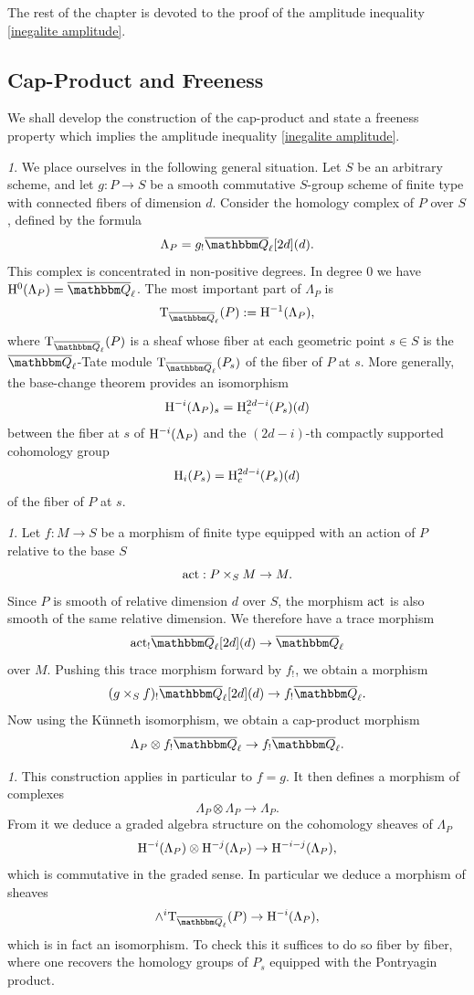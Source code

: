 \documentclass[12pt,english]{smfart}
\numberwithin{equation}{subsection}
\theoremstyle{remark}
\newtheorem{numero}[equation]{}
\newcommand\rmT{{\rm T}}
\newcommand\QQ{{\mathbbm Q}}
\newcommand\rmH{{\rm H}}
\newcommand\act{{\rm act}}
\newcommand\Ql{{\overline\QQ_\ell}}
\begin{document}
The rest of the chapter is devoted to the proof of the amplitude inequality \ref{inegalite amplitude}.

\subsection{Cap-Product and Freeness}\label{subsection : cap-produit}

We shall develop the construction of the cap-product and state a freeness property which implies the amplitude inequality \ref{inegalite amplitude}.

\begin{numero}\label{complexe homologie P}
We place ourselves in the following general situation. Let $S$ be an arbitrary scheme, and let $g:P\rightarrow S$ be a smooth commutative $S$-group scheme of finite type with connected fibers of dimension $d$. Consider the homology complex of $P$ over $S$, defined by the formula
$$\Lambda_P=g_!\Ql[2d](d).$$
This complex is concentrated in non-positive degrees. In degree $0$ we have $\rmH^0(\Lambda_P)=\Ql$. The most important part of $\Lambda_P$ is
$$\rmT_\Ql(P):=\rmH^{-1}(\Lambda_P),$$
where $\rmT_\Ql(P)$ is a sheaf whose fiber at each geometric point $s\in S$ is the $\Ql$-Tate module $\rmT_\Ql(P_s)$ of the fiber of $P$ at $s$. More generally, the base-change theorem provides an isomorphism
$$\rmH^{-i}(\Lambda_P)_s=\rmH_c^{2d-i}(P_s)(d)$$
between the fiber at $s$ of $\rmH^{-i}(\Lambda_P)$ and the $(2d-i)$-th compactly supported cohomology group
$$\rmH_i(P_s)=\rmH_c^{2d-i}(P_s)(d)$$
of the fiber of $P$ at $s$.
\end{numero}

\begin{numero}\label{cap-produit}
Let $f:M\rightarrow S$ be a morphism of finite type equipped with an action of $P$ relative to the base $S$
$$\act:P\times_S M\rightarrow M.$$
Since $P$ is smooth of relative dimension $d$ over $S$, the morphism $\act$ is also smooth of the same relative dimension. We therefore have a trace morphism
$$\act_!\Ql[2d](d)\rightarrow \Ql$$
over $M$. Pushing this trace morphism forward by $f_!$, we obtain a morphism
$$(g\times_S f)_!\Ql[2d](d)\rightarrow f_!\Ql.$$
Now using the K\"unneth isomorphism, we obtain a cap-product morphism
$$\Lambda_P\otimes f_!\Ql \rightarrow f_!\Ql.$$
\end{numero}

\begin{numero}\label{algebre graduee homologie}
This construction applies in particular to $f=g$. It then defines a morphism of complexes
$$\Lambda_P\otimes \Lambda_P\rightarrow \Lambda_P.$$
From it we deduce a graded algebra structure on the cohomology sheaves of $\Lambda_P$
$$\rmH^{-i}(\Lambda_P)\otimes \rmH^{-j}(\Lambda_P)\rightarrow \rmH^{-i-j}(\Lambda_P),$$
which is commutative in the graded sense. In particular we deduce a morphism of sheaves
$$\wedge^i \rmT_\Ql(P)\rightarrow \rmH^{-i}(\Lambda_P),$$
which is in fact an isomorphism. To check this it suffices to do so fiber by fiber, where one recovers the homology groups of $P_s$ equipped with the Pontryagin product.
\end{numero}
\end{document}
